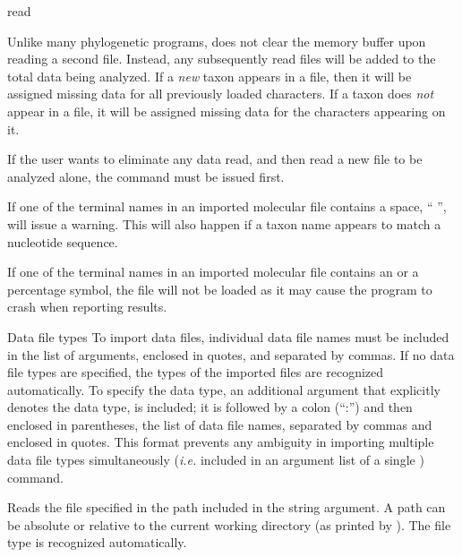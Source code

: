 \begin{command}{read}{}
\begin{poydescription}
        \begin{statement}
            Unlike many phylogenetic programs, \poy does not clear the memory
            buffer upon reading a second file. Instead, any subsequently read files
            will be added to the total data being analyzed.  If a \emph{new} taxon
            appears in a file, then it will be assigned missing data for all
            previously loaded characters. If a taxon does \emph{not} appear in a
            file, it will be assigned missing data for the characters appearing on
            it. 
            
            If the user wants to eliminate any data read, and then read a new file
            to be analyzed alone, the  command must be issued
            first. 
        \end{statement}
        
        \begin{statement}
             If one of the terminal names in an imported molecular file contains
             a space, `` '', \poy will issue a warning. This will also happen if a
             taxon name appears to match a nucleotide sequence.

             If one of the terminal names in an imported molecular file contains
             an \atsymbol or a percentage symbol, the file will not be loaded as
             it may cause the program to crash when reporting results.
        \end{statement}
	\end{poydescription}

	\begin{arguments}

	  \begin{argumentgroup}{Data file types}
	  To import data files, individual data file names must be included in the list of
	   arguments, enclosed in quotes, and separated
	  by commas. If no data file types are specified, the types of the imported
	  files are recognized automatically. To specify the data type,
	  an additional argument that explicitly denotes the data type,
	  is included; it is followed by a colon (``:'') and then enclosed in parentheses, the
	  list of data file names, separated by commas and enclosed in quotes. This
	  format prevents any ambiguity in importing multiple data file types
	  simultaneously (\emph{i.e.} included in an argument list of a single )
	  command.

              {Reads the file specified in the path included in the string argument.
              A path can be absolute or relative to the current
              working directory (as printed by ). The file type
              is recognized automatically.

}
\end{argumentgroup}
\end{arguments}
\end{command}
